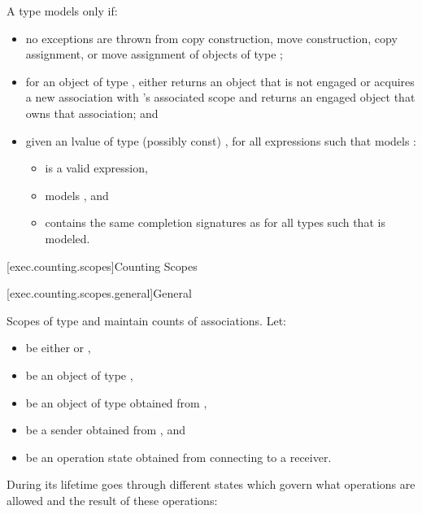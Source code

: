 \pnum
A type  models  only if:

\begin{itemize}
\item
no exceptions are thrown from
copy construction,
move construction,
copy assignment, or
move assignment
of objects of type ;

\item
for an object  of type ,
 either
returns an object that is not engaged or
acquires a new association with 's associated scope and
returns an engaged object that owns that association; and

\item
given an lvalue  of type (possibly const) ,
for all expressions  such that
 models :
  \begin{itemize}
  \item
   is a valid expression,
  \item
   models , and
  \item
  contains the same completion signatures as
  for all types  such that
   is modeled.
  \end{itemize}
\end{itemize}

[exec.counting.scopes]{Counting Scopes}

[exec.counting.scopes.general]{General}

\pnum
Scopes of type  and 
maintain counts of associations.
Let:
\begin{itemize}
\item
{} be either  or ,
\item
{} be an object of type ,
\item
{} be an object of type 
obtained from ,
\item
{} be a sender obtained from , and
\item
{} be an operation state obtained from
connecting  to a receiver.
\end{itemize}
During its lifetime  goes through different states
which govern what operations are allowed and the result of these operations:

